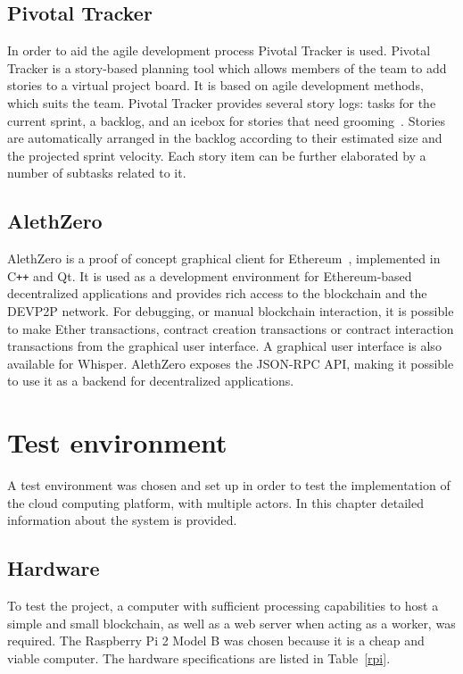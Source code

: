 \subsection{Pivotal Tracker}
In order to aid the agile development process Pivotal Tracker is used. Pivotal Tracker is a story-based planning tool which allows members of the team to add stories to a virtual project board. It is based on agile development methods, which suits the team. Pivotal Tracker provides several story logs: tasks for the current sprint, a backlog, and an icebox for stories that need grooming~\cite{pivotaltracker}. Stories are automatically arranged in the backlog according to their estimated size and the projected sprint velocity. Each story item can be further elaborated by a number of subtasks related to it. 

\subsection{AlethZero}
AlethZero is a proof of concept graphical client for Ethereum~\cite{github-alethzero}, implemented in C\texttt{++} and Qt. It is used as a development environment for Ethereum-based decentralized applications and provides rich access to the blockchain and the DEVP2P network. For debugging, or manual blockchain interaction, it is possible to make Ether transactions, contract creation transactions or contract interaction transactions from the graphical user interface. A graphical user interface is also available for Whisper. AlethZero exposes the JSON-RPC API, making it possible to use it as a backend for decentralized applications.

\section{Test environment}
A test environment was chosen and set up in order to test the implementation of the cloud computing platform, with multiple actors. In this chapter detailed information about the system is provided.

\subsection{Hardware}
To test the project, a computer with sufficient processing capabilities to host a simple and small blockchain, as well as a web server when acting as a worker, was required. The Raspberry Pi 2 Model B was chosen because it is a cheap and viable computer. The hardware specifications are listed in Table~\ref{rpi}.

